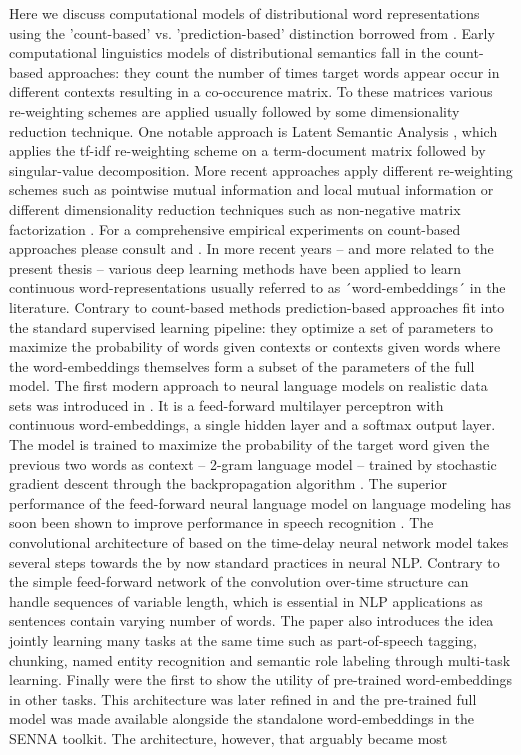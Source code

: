 Here we discuss computational models of distributional word representations using the 'count-based' vs. 'prediction-based' distinction borrowed from \cite{baroni2014don}. Early computational linguistics models of distributional semantics fall in the   count-based  approaches: they count the number of times target words appear occur in different contexts resulting in a co-occurence matrix. To these matrices various re-weighting schemes are applied usually followed by some dimensionality reduction technique. One notable approach is Latent Semantic Analysis \cite{dumais2004latent}, which applies the tf-idf re-weighting scheme on a term-document matrix followed by singular-value decomposition. More recent approaches apply different re-weighting schemes such as pointwise mutual information and local mutual information \cite{evert2005statistics} or different dimensionality reduction techniques such as non-negative matrix factorization \cite{baroni2014don}. For a comprehensive empirical experiments on count-based approaches please consult \cite{bullinaria2007extracting} and \cite{bullinaria2012extracting}. In more recent years -- and more related to the present thesis -- various deep learning methods have been applied to learn continuous word-representations usually referred to as ´word-embeddings´ in the literature. Contrary to count-based methods prediction-based approaches fit into the standard supervised learning pipeline: they optimize a set of parameters to maximize the probability of words given contexts or contexts given words where the word-embeddings themselves form a subset of the parameters of the full model. The first modern approach to neural language models on realistic data sets was introduced in \cite{bengio2003neural}. It is a feed-forward multilayer perceptron with continuous word-embeddings, a single hidden layer and a softmax output layer. The model is trained to maximize the probability of the target word given the previous two words as context -- 2-gram language model -- trained by stochastic gradient descent \cite{cauchy1847methode} through the backpropagation  algorithm \cite{rumelhart1985learning}. The superior performance of the feed-forward neural language model on language modeling has soon been shown to improve performance in speech recognition \cite{schwenk2005training}. The convolutional architecture of  \cite{collobert2008unified} based on the time-delay neural network model \cite{waibel1990phoneme} takes several steps towards the by now standard practices in neural NLP. Contrary to the simple feed-forward network of \cite{bengio2003neural} the  convolution over-time structure can handle sequences of variable length, which is essential in NLP applications as sentences contain varying number of words. The paper also introduces the idea jointly learning many tasks at the same time such as part-of-speech tagging, chunking, named entity recognition and semantic role labeling through multi-task learning. Finally \cite{collobert2008unified} were the first to show the utility of pre-trained word-embeddings in other tasks. This architecture was later refined in \cite{collobert2011natural} and the pre-trained full model was made available alongside the standalone word-embeddings in the SENNA toolkit. The architecture, however, that arguably became most 
